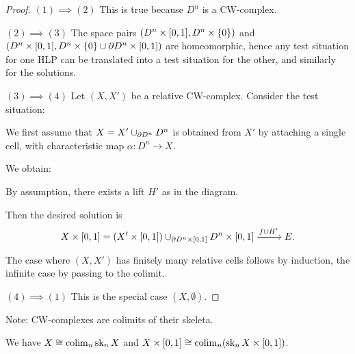 \begin{proof}

$(1)\implies(2)$ This is true because $D^n$ is a CW-complex.

$(2)\implies(3)$ The space pairs $(D^n\times[0,1],D^n\times\{0\})$ and $(D^n\times[0,1],D^n\times\{0\}\cup\partial D^n\times[0,1])$ are homeomorphic, hence any test situation for one HLP can be translated into a test situation for the other, and similarly for the solutions.

$(3)\implies(4)$ Let $(X,X')$ be a relative CW-complex. Consider the test situation:
\begin{center}
\end{center}

We first assume that $X=X'\cup_{\partial D^n}D^n$ is obtained from $X'$ by attaching a single cell, with characteristic map $\alpha:D^n\to X$.

We obtain:

\begin{center}
\end{center}

By assumption, there exists a lift $H'$ as in the diagram.

Then the desired solution is
\[X\times[0,1]=(X'\times[0,1])\cup_{\partial D^n\times[0,1]}D^n\times[0,1]\xrightarrow{f\cup H'}E.\]

The case where $(X,X')$ has finitely many relative cells follows by induction, the infinite case by passing to the colimit.

$(4)\implies(1)$ This is the special case $(X,\emptyset)$.
\end{proof}

\begin{remark}
Note: CW-complexes are colimits of their skeleta.

\begin{center}
\end{center}

We have $X\cong\operatorname*{colim}_n\operatorname{sk}_n X$ and $X\times[0,1]\cong\operatorname*{colim}_n(\operatorname{sk}_n X\times[0,1])$.
\end{remark}

